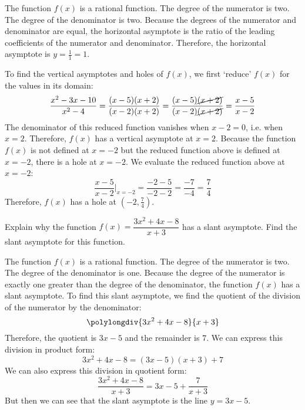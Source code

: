 \documentclass[12pt,letterpaper]{exam}
\begin{document}
\begin{questions}
The function $f(x)$ is a rational function. The degree of the numerator is two. The degree of the denominator is two. Because the degrees of the numerator and denominator are equal, the horizontal asymptote is the ratio of the leading coefficients of the numerator and denominator. Therefore, the horizontal asymptote is $y= \frac{1}{1}= 1$. \pspace

To find the vertical asymptotes and holes of $f(x)$, we first `reduce' $f(x)$ for the values in its domain:
	\[
	\dfrac{x^2 - 3x - 10}{x^2 - 4}= \dfrac{(x - 5)(x + 2)}{(x - 2)(x + 2)}= \dfrac{(x - 5)\cancel{(x + 2)}}{(x - 2)\cancel{(x + 2)}}= \dfrac{x - 5}{x - 2}
	\]
The denominator of this reduced function vanishes when $x - 2= 0$, i.e. when $x= 2$. Therefore, $f(x)$ has a vertical asymptote at $x= 2$. Because the function $f(x)$ is not defined at $x= -2$ but the reduced function above is defined at $x= -2$, there is a hole at $x= -2$. We evaluate the reduced function above at $x= -2$:
	\[
	\dfrac{x - 5}{x - 2} \bigg|_{x= -2}= \dfrac{-2 - 5}{-2 - 2}= \dfrac{-7}{-4}= \dfrac{7}{4}
	\]
Therefore, $f(x)$ has a hole at $\left(-2, \frac{7}{4} \right)$. 



\newpage
\question[10] Explain why the function $f(x)= \dfrac{3x^2 + 4x - 8}{x + 3}$ has a slant asymptote. Find the slant asymptote for this function. \pspace

\sol The function $f(x)$ is a rational function. The degree of the numerator is two. The degree of the denominator is one. Because the degree of the numerator is exactly one greater than the degree of the denominator, the function $f(x)$ has a slant asymptote. To find this slant asymptote, we find the quotient of the division of the numerator by the denominator: 
	\[
	\polylongdiv{3x^2 + 4x - 8}{x + 3}
	\]
Therefore, the quotient is $3x - 5$ and the remainder is $7$. We can express this division in product form:
	\[
	3x^2 + 4x - 8= (3x - 5)(x + 3) + 7
	\]
We can also express this division in quotient form:
	\[
	\dfrac{3x^2 + 4x - 8}{x + 3}= 3x - 5 + \dfrac{7}{x + 3}
	\]
But then we can see that the slant asymptote is the line $y= 3x - 5$.


\end{questions}
\end{document}
